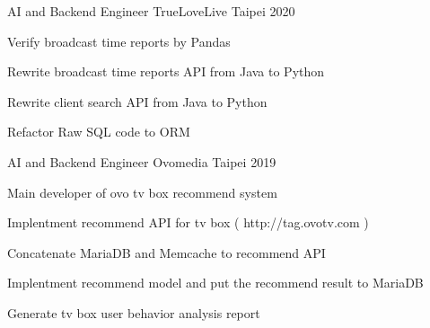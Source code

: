 

\begin{cventries}

  \cventry
    {AI and Backend Engineer} %
    {TrueLoveLive} %
    {Taipei} %
    {2020} %
    {
      \begin{cvitems} %
        \item {Verify broadcast time reports by Pandas}
        \item {Rewrite broadcast time reports API from Java to Python}
        \item {Rewrite client search API from Java to Python}
        \item {Refactor Raw SQL code to ORM}
      \end{cvitems}
    }

  \cventry
    {AI and Backend Engineer} %
    {Ovomedia} %
    {Taipei} %
    {2019} %
    {
      \begin{cvitems} %
        \item {Main developer of ovo tv box recommend system}
        \item {Implentment recommend API for tv box ( http://tag.ovotv.com )}
        \item {Concatenate MariaDB and Memcache to recommend API}
        \item {Implentment recommend model and put the recommend result to MariaDB}
        \item {Generate tv box user behavior analysis report}
      \end{cvitems}
    }

\end{cventries}
